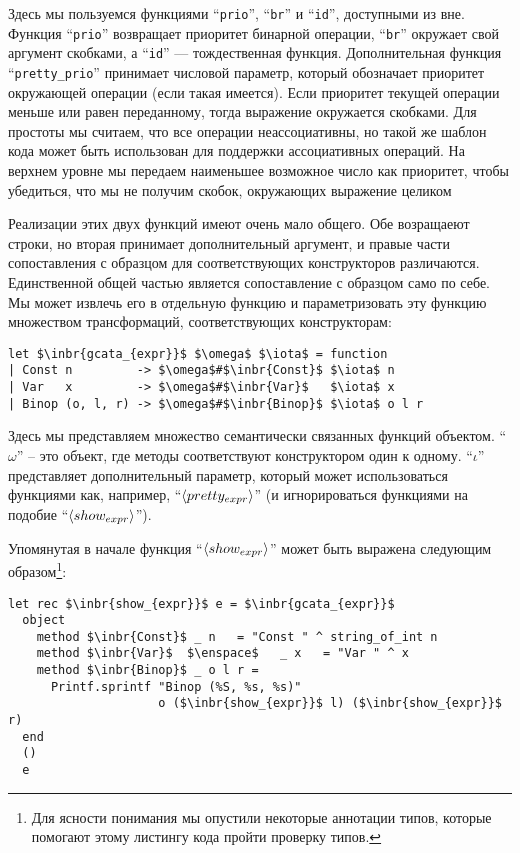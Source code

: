 Здесь мы пользуемся функциями ``\lstinline{prio}'', ``\lstinline{br}'' и ``\lstinline{id}'', доступными из вне. Функция ``\lstinline{prio}''
возвращает приоритет бинарной операции, ``\lstinline{br}'' окружает свой аргумент скобками, а ``\lstinline{id}'' --- тождественная функция.
Дополнительная функция ``\lstinline{pretty_prio}'' принимает числовой параметр, который обозначает приоритет окружающей операции (если такая имеется). Если приоритет текущей операции меньше или равен переданному, тогда выражение окружается скобками. Для простоты мы считаем, что все операции неассоциативны, но такой же шаблон кода может быть использован для поддержки ассоциативных операций.
На верхнем уровне мы передаем наименьшее возможное число как приоритет, чтобы убедиться, что мы не получим скобок, окружающих выражение целиком 

Реализации этих двух функций имеют очень мало общего. Обе возращаеют строки, но вторая принимает дополнительный аргумент, и 
правые части сопоставления с образцом для соответствующих конструкторов различаются. Единственной общей частью является
сопоставление с образцом само по себе. Мы может извлечь его в отдельную функцию и параметризовать эту функцию множеством трансформаций, 
соответствующих конструкторам:

\begin{lstlisting}
let $\inbr{gcata_{expr}}$ $\omega$ $\iota$ = function
| Const n         -> $\omega$#$\inbr{Const}$ $\iota$ n
| Var   x         -> $\omega$#$\inbr{Var}$   $\iota$ x
| Binop (o, l, r) -> $\omega$#$\inbr{Binop}$ $\iota$ o l r
\end{lstlisting}

Здесь мы представляем множество семантически связанных функций объектом. ``$\omega$'' -- это объект, где методы соответствуют конструктором
один к одному. ``$\iota$'' представляет дополнительный параметр, который может использоваться функциями как, например, ``$\left<pretty_{expr}\right>$'' (и игнорироваться функциями на подобие ``$\left<show_{expr}\right>$'').

Упомянутая в начале функция ``$\left<show_{expr}\right>$'' может быть выражена следующим образом\footnote{Для ясности понимания мы опустили некоторые аннотации типов, которые помогают этому листингу кода пройти проверку типов.}:

\begin{lstlisting}
let rec $\inbr{show_{expr}}$ e = $\inbr{gcata_{expr}}$
  object
    method $\inbr{Const}$ _ n   = "Const " ^ string_of_int n
    method $\inbr{Var}$  $\enspace$   _ x   = "Var " ^ x
    method $\inbr{Binop}$ _ o l r =
      Printf.sprintf "Binop (%S, %s, %s)" 
                     o ($\inbr{show_{expr}}$ l) ($\inbr{show_{expr}}$ r)
  end
  ()
  e
\end{lstlisting}

